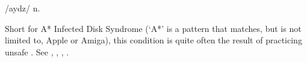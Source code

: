  /aydz/ n.

Short for A* Infected Disk Syndrome (`A*' is a  pattern that matches, but is not limited to, Apple or Amiga), this condition
is quite often the result of practicing unsafe . See , , ,
.

